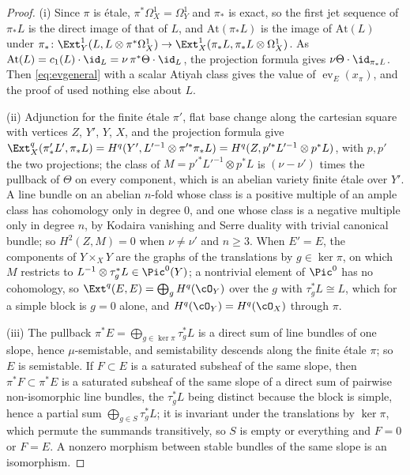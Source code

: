 \begin{proof}
(i) Since $\pi$ is \'etale, $\pi^{*}\Omega^{1}_{X}=\Omega^{1}_{Y}$ and $\pi_{*}$
is exact, so the first jet sequence of $\pi_{*}L$ is the direct image of
that of $L$, and $\mathrm{At}(\pi_{*}L)$ is the image of $\mathrm{At}(L)$
under $\pi_{*}\colon\Ext^{1}_{Y}(L,L\otimes\pi^{*}\Omega^{1}_{X})\to
\Ext^{1}_{X}(\pi_{*}L,\pi_{*}L\otimes\Omega^{1}_{X})$. As $\mathrm{At}(L)=c_{1}(L)\cdot\id_{L}
=\nu\,\pi^{*}\Theta\cdot\id_{L}$, the projection formula gives
$\nu\Theta\cdot\id_{\pi_{*}L}$. Then \eqref{eq:evgeneral} with a scalar Atiyah
class gives the value of $\operatorname{ev}_{E}(x_{\pi})$, and the proof of
 used nothing else about $L$.

(ii) Adjunction for the finite \'etale $\pi'$, flat base change along the
cartesian square with vertices $Z$, $Y'$, $Y$, $X$, and the projection formula
give $\Ext^{q}_{X}(\pi'_{*}L',\pi_{*}L)=H^{q}(Y',L'^{-1}\otimes\pi'^{*}\pi_{*}L)
=H^{q}(Z,p'^{*}L'^{-1}\otimes p^{*}L)$, with $p,p'$ the two projections; the
class of $M=p'^{*}L'^{-1}\otimes p^{*}L$ is $(\nu-\nu')$ times the pullback of
$\Theta$ on every component, which is an abelian variety finite \'etale over
$Y'$. A line bundle on an abelian $n$-fold whose class is a positive
multiple of an ample class has cohomology only in degree $0$, and one whose
class is a negative multiple only in degree $n$, by Kodaira vanishing and
Serre duality with trivial canonical bundle; so $H^{2}(Z,M)=0$ when
$\nu\ne\nu'$ and $n\ge3$. When $E'=E$, the components of $Y\times_{X}Y$ are
the graphs of the translations by $g\in\ker\pi$, on which $M$ restricts to
$L^{-1}\otimes\tau_{g}^{*}L\in\Pic^{0}(Y)$; a nontrivial element of $\Pic^{0}$
has no cohomology, so $\Ext^{q}(E,E)=\bigoplus_{g}H^{q}(\cO_{Y})$ over the
$g$ with $\tau_{g}^{*}L\cong L$, which for a simple block is $g=0$ alone, and
$H^{q}(\cO_{Y})=H^{q}(\cO_{X})$ through $\pi$.

(iii) The pullback $\pi^{*}E=\bigoplus_{g\in\ker\pi}\tau_{g}^{*}L$ is a direct
sum of line bundles of one slope, hence $\mu$-semistable, and semistability
descends along the finite \'etale $\pi$; so $E$ is semistable. If $F\subset E$
is a saturated subsheaf of the same slope, then $\pi^{*}F\subset\pi^{*}E$ is
a saturated subsheaf of the same slope of a direct sum of pairwise
non-isomorphic line bundles, the $\tau_{g}^{*}L$ being distinct because the
block is simple, hence a partial sum $\bigoplus_{g\in S}\tau_{g}^{*}L$; it is
invariant under the translations by $\ker\pi$, which permute the summands
transitively, so $S$ is empty or everything and $F=0$ or $F=E$. A nonzero
morphism between stable bundles of the same slope is an isomorphism.
\end{proof}

